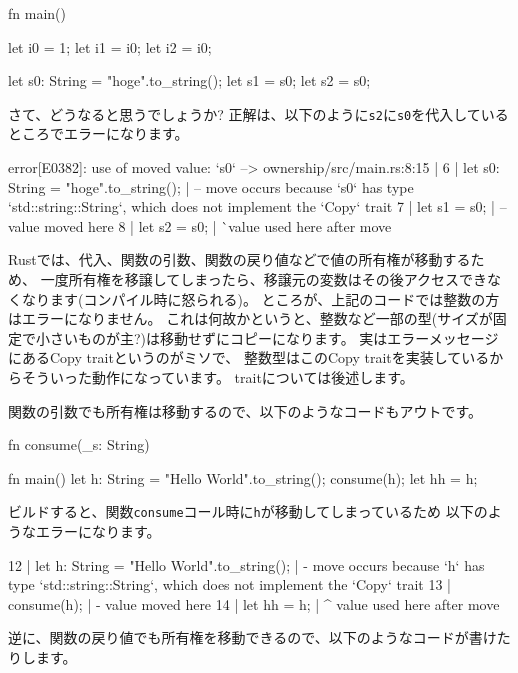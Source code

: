\documentclass[mingoth,a4paper]{jsarticle}
\begin{document}
\begin{commandline}
fn main() {
    let i0 = 1;
    let i1 = i0;
    let i2 = i0;

    let s0: String = "hoge".to_string();
    let s1 = s0;
    let s2 = s0;
}
\end{commandline}

さて、どうなると思うでしょうか?
正解は、以下のように\texttt{s2}に\texttt{s0}を代入しているところでエラーになります。

\begin{commandline}
error[E0382]: use of moved value: `s0`
 --> ownership/src/main.rs:8:15
  |
6 |     let s0: String = "hoge".to_string();
  |         -- move occurs because `s0` has type `std::string::String`, which does not implement the `Copy` trait
7 |     let s1 = s0;
  |              -- value moved here
8 |     let s2 = s0;
  |              ^^ value used here after move
\end{commandline}

Rustでは、代入、関数の引数、関数の戻り値などで値の所有権が移動するため、
一度所有権を移譲してしまったら、移譲元の変数はその後アクセスできなくなります(コンパイル時に怒られる)。
ところが、上記のコードでは整数の方はエラーになりません。
これは何故かというと、整数など一部の型(サイズが固定で小さいものが主?)は移動せずにコピーになります。
実はエラーメッセージにあるCopy traitというのがミソで、
整数型はこのCopy traitを実装しているからそういった動作になっています。
traitについては後述します。

関数の引数でも所有権は移動するので、以下のようなコードもアウトです。

\begin{commandline}
fn consume(_s: String) {}

fn main() {
    let h: String = "Hello World".to_string();
    consume(h);
    let hh = h;
}
\end{commandline}

ビルドすると、関数\texttt{consume}コール時に\texttt{h}が移動してしまっているため
以下のようなエラーになります。

\begin{commandline}
12 |     let h: String = "Hello World".to_string();
   |         - move occurs because `h` has type `std::string::String`, which does not implement the `Copy` trait
13 |     consume(h);
   |             - value moved here
14 |     let hh = h;
   |              ^ value used here after move
\end{commandline}

逆に、関数の戻り値でも所有権を移動できるので、以下のようなコードが書けたりします。
\end{document}
